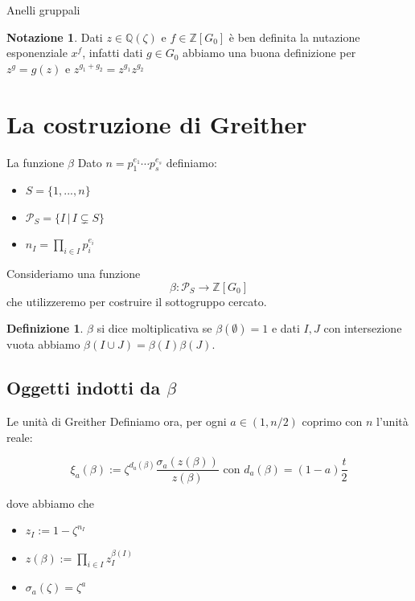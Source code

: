 \documentclass[handout]{beamer}
\theoremstyle{plain}
\theoremstyle{remark}
\theoremstyle{definition}
\newtheorem{deff}[teo]{Definizione}
\newtheorem*{nota}{Notazione}
\newcommand{\PS}{\mathcal{P}_S}
\newcommand{\Z}{\mathbb{Z}}
\newcommand{\Q}{\mathbb{Q}}
\begin{document}
	\begin{frame}{Anelli gruppali}
		\begin{nota}
				Dati $ z \in \Q (\zeta) $ e $ f \in \Z[G_0]  $ è ben definita la nutazione esponenziale $ x^f $, \pause infatti dati $ g\in G_0 $ abbiamo una buona definizione per  $ z^g = g(z) $ e $ z ^{g_1 + g_2}= z^{g_1} z^{g_2} $
		\end{nota}
	\end{frame}
	
\section{La costruzione di Greither}
	
	\begin{frame}[fragile]{La funzione $\beta$}
		Dato $ n= p_1 ^{e_1} \cdots p_s ^{e_s} $ definiamo: 
		\begin{itemize}
			\item $ S = \{1, ... , n \}$
			\item $ \PS = \{ I \,|\, I \subsetneq S\}$ 
			\item $ n_I = \prod_{i \in I} p_i ^{e_i} $ 
		\end{itemize} \pause
		Consideriamo una funzione $$ \beta : \PS \to \Z[G_0] $$ che utilizzeremo per costruire il sottogruppo cercato. \pause 
		\begin{deff}
			$\beta$ si dice moltiplicativa se $ \beta (\emptyset) = 1 $ e dati $ I,J $ con intersezione vuota abbiamo $ \beta (I\cup J) = \beta(I) \beta(J)$.
		\end{deff}
	\end{frame}

\subsection{Oggetti indotti da $\beta$}
	\begin{frame}{Le unità di Greither}
		Definiamo ora, per ogni $ a \in (1 , n/2)$ coprimo con $ n $ l'unità reale:
			\begin{exampleblock}{}
			\[
				\xi_a (\beta) := \zeta ^{d_a (\beta)} \frac{\sigma_a (z(\beta))}{z(\beta)} \text{ con } d_a(\beta)= (1-a)\frac{t}{2}
			\]
			\end{exampleblock}
			dove abbiamo che
			\begin{itemize}
				\item $ z_I  := 1 - \zeta ^{n_I}$
				\item $ z(\beta ):= \prod_{i\in I} z_I ^{\beta(I)} $
				\item $ \sigma_a(\zeta)= \zeta ^a $
			\end{itemize}
	\end{frame}	
	
\end{document}
